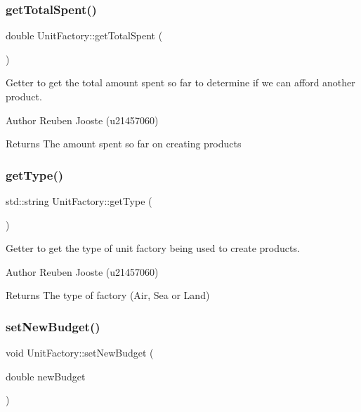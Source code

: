 \subsubsection{\texorpdfstring{getTotalSpent()}{getTotalSpent()}}
{\footnotesize\ttfamily double Unit\+Factory\+::get\+Total\+Spent (\begin{DoxyParamCaption}{ }\end{DoxyParamCaption})}



Getter to get the total amount spent so far to determine if we can afford another product. 

\begin{DoxyAuthor}{Author}
Reuben Jooste (u21457060) 
\end{DoxyAuthor}
\begin{DoxyReturn}{Returns}
The amount spent so far on creating products 
\end{DoxyReturn}
\mbox{\label{class_unit_factory_aa850ff53daee1055f5d677d93604ce92}} 
\subsubsection{\texorpdfstring{getType()}{getType()}}
{\footnotesize\ttfamily std\+::string Unit\+Factory\+::get\+Type (\begin{DoxyParamCaption}{ }\end{DoxyParamCaption})}



Getter to get the type of unit factory being used to create products. 

\begin{DoxyAuthor}{Author}
Reuben Jooste (u21457060) 
\end{DoxyAuthor}
\begin{DoxyReturn}{Returns}
The type of factory (Air, Sea or Land) 
\end{DoxyReturn}
\mbox{\label{class_unit_factory_a7d8d6b90c54a3cbc230ef5f4c80283d5}} 
\subsubsection{\texorpdfstring{setNewBudget()}{setNewBudget()}}
{\footnotesize\ttfamily void Unit\+Factory\+::set\+New\+Budget (\begin{DoxyParamCaption}\item[{double}]{new\+Budget }\end{DoxyParamCaption})}



